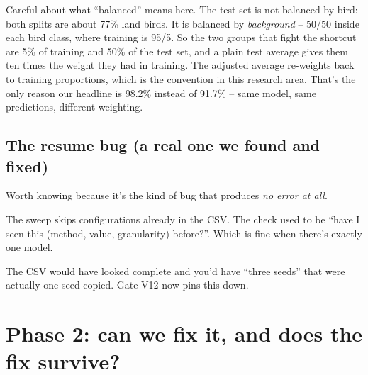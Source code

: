 \documentclass[11pt]{article}
\newcommand{\code}[1]{\texttt{\small #1}}
\begin{document}
\noindent Careful about what ``balanced'' means here. The test set is not
balanced by bird: both splits are about 77\% land birds. It is balanced by
\emph{background} -- 50/50 inside each bird class, where training is 95/5.
So the two groups that fight the shortcut are 5\% of training and 50\% of the
test set, and a plain test average gives them ten times the weight they had in
training. The adjusted average re-weights back to training proportions, which is
the convention in this research area. That's the only reason our headline is
98.2\% instead of 91.7\% -- same model, same predictions, different weighting.

\subsection{The resume bug (a real one we found and fixed)}

Worth knowing because it's the kind of bug that produces \emph{no error at all}.

The sweep skips configurations already in the CSV. The check used to be
``have I seen this (method, value, granularity) before?''. Which is fine when
there's exactly one model.

\begin{center}
\end{center}

\noindent The CSV would have looked complete and you'd have ``three seeds'' that
were actually one seed copied. Gate V12 now pins this down.

\section{Phase 2: can we fix it, and does the fix survive?}\label{sec:phase2}
\end{document}
